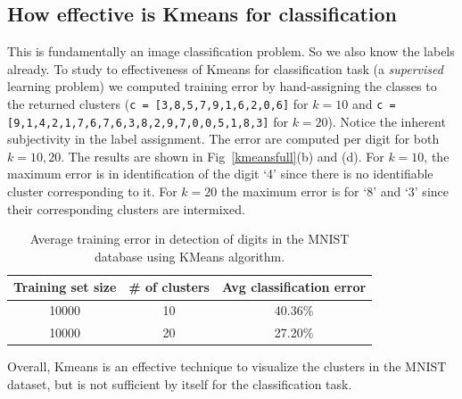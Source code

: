 \documentclass[10pt,letterpaper]{article}
\begin{document}
\subsection{How effective is Kmeans for classification}
This is fundamentally an image classification problem. So we also know the labels already. To study to effectiveness of Kmeans for classification task (a {\em supervised} learning problem) we computed training error by hand-assigning the classes to the returned clusters ({\tt c = [3,8,5,7,9,1,6,2,0,6]} for $k=10$ and {\tt c = [9,1,4,2,1,7,6,7,6,3,8,2,9,7,0,0,5,1,8,3]} for $k=20$). Notice the inherent subjectivity in the label assignment. The error are computed per digit for both $k = 10, 20$. The results are shown in Fig~\ref{kmeansfull}(b) and (d). For $k=10$, the maximum error is in identification of the digit `4' since there is no identifiable cluster corresponding to it. For $k=20$ the maximum error is for `8' and `3' since their corresponding clusters are intermixed. 
\begin{table}[tbp]
    \begin{center}
        \begin{tabular}{c|c|c}
            \hline
            {\bf Training set size}&{\bf \# of clusters}&{\bf Avg classification error} \\ \hline
            10000&10&40.36\% \\
            10000&20&27.20\% \\ \hline
            \end{tabular}
            \caption{Average training error in detection of digits in the MNIST database using KMeans algorithm. \label{tab1} }
        \end{center}
\end{table}
Overall, Kmeans is an effective technique to visualize the clusters in the MNIST dataset, but is not sufficient by itself for the classification task.
\end{document}
